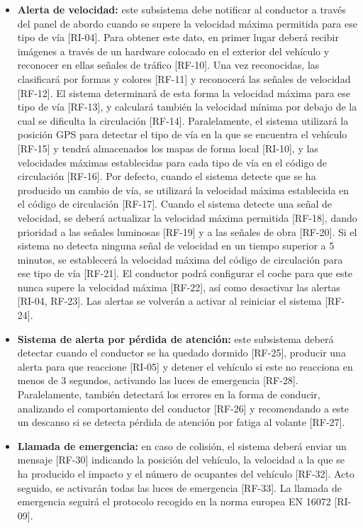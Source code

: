 \begin{itemize}[-]
\item \textbf{Alerta de velocidad:}  este subsistema debe notificar al conductor a través del panel de abordo cuando se supere la velocidad máxima permitida para ese tipo de vía [RI-04]. Para obtener este dato, en primer lugar deberá recibir imágenes a través de un hardware colocado en el exterior del vehículo y reconocer en ellas señales de tráfico [RF-10]. Una vez reconocidas, las clasificará por formas y colores [RF-11] y reconocerá las señales de velocidad [RF-12]. El sistema determinará de esta forma la velocidad máxima para ese tipo de vía [RF-13], y calculará también la velocidad mínima por debajo de la cual se dificulta la circulación [RF-14]. Paralelamente, el sistema utilizará la posición GPS para detectar el tipo de vía en la que se encuentra el vehículo [RF-15] y tendrá almacenados los mapas de forma local [RI-10], y las velocidades máximas establecidas para cada tipo de vía en el código de circulación [RF-16]. Por defecto, cuando el sistema detecte que se ha producido un cambio de vía, se utilizará la velocidad máxima establecida en el código de circulación [RF-17]. Cuando el sistema detecte una señal de velocidad, se deberá actualizar la velocidad máxima permitida [RF-18], dando prioridad a las señales luminosas [RF-19] y a las señales de obra [RF-20]. Si el sistema no detecta ninguna señal de velocidad en un tiempo superior a 5 minutos, se establecerá la velocidad máxima del código de circulación para ese tipo de vía [RF-21]. El conductor podrá configurar el coche para que este nunca supere la velocidad máxima [RF-22], así como desactivar las alertas [RI-04, RF-23]. Las alertas se volverán a activar al reiniciar el sistema [RF-24].
\item \textbf{Sistema de alerta por pérdida de atención:} este subsistema deberá detectar cuando el conductor se ha quedado dormido [RF-25], producir una alerta para que reaccione [RI-05] y detener el vehículo si este no reacciona en menos de 3 segundos, activando las luces de emergencia [RF-28]. Paralelamente, también detectará los errores en la forma de conducir, analizando el comportamiento del conductor [RF-26] y recomendando a este un descanso si se detecta pérdida de atención por fatiga al volante [RF-27].
\item \textbf{Llamada de emergencia:} en caso de colisión, el sistema deberá enviar un mensaje [RF-30] indicando la posición del vehículo, la velocidad a la que se ha producido el impacto y el número de ocupantes del vehículo [RF-32]. Acto seguido, se activarán todas las luces de emergencia [RF-33]. La llamada de emergencia seguirá el protocolo recogido en la norma europea EN 16072 [RI-09].

\end{itemize}
